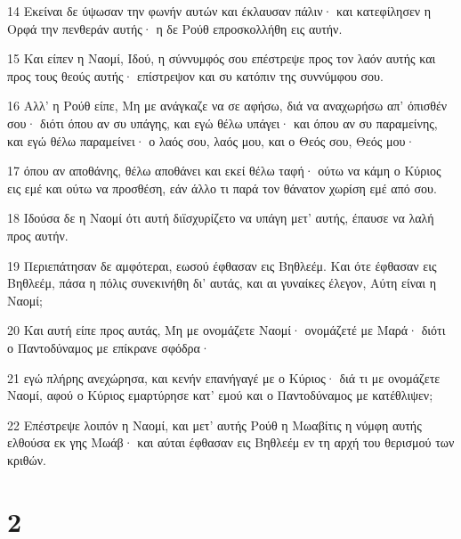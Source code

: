 \par 14 Εκείναι δε ύψωσαν την φωνήν αυτών και έκλαυσαν πάλιν· και κατεφίλησεν η Ορφά την πενθεράν αυτής· η δε Ρούθ επροσκολλήθη εις αυτήν.
\par 15 Και είπεν η Ναομί, Ιδού, η σύννυμφός σου επέστρεψε προς τον λαόν αυτής και προς τους θεούς αυτής· επίστρεψον και συ κατόπιν της συννύμφου σου.
\par 16 Αλλ' η Ρούθ είπε, Μη με ανάγκαζε να σε αφήσω, διά να αναχωρήσω απ' όπισθέν σου· διότι όπου αν συ υπάγης, και εγώ θέλω υπάγει· και όπου αν συ παραμείνης, και εγώ θέλω παραμείνει· ο λαός σου, λαός μου, και ο Θεός σου, Θεός μου·
\par 17 όπου αν αποθάνης, θέλω αποθάνει και εκεί θέλω ταφή· ούτω να κάμη ο Κύριος εις εμέ και ούτω να προσθέση, εάν άλλο τι παρά τον θάνατον χωρίση εμέ από σου.
\par 18 Ιδούσα δε η Ναομί ότι αυτή διϊσχυρίζετο να υπάγη μετ' αυτής, έπαυσε να λαλή προς αυτήν.
\par 19 Περιεπάτησαν δε αμφότεραι, εωσού έφθασαν εις Βηθλεέμ. Και ότε έφθασαν εις Βηθλεέμ, πάσα η πόλις συνεκινήθη δι' αυτάς, και αι γυναίκες έλεγον, Αύτη είναι η Ναομί;
\par 20 Και αυτή είπε προς αυτάς, Μη με ονομάζετε Ναομί· ονομάζετέ με Μαρά· διότι ο Παντοδύναμος με επίκρανε σφόδρα·
\par 21 εγώ πλήρης ανεχώρησα, και κενήν επανήγαγέ με ο Κύριος· διά τι με ονομάζετε Ναομί, αφού ο Κύριος εμαρτύρησε κατ' εμού και ο Παντοδύναμος με κατέθλιψεν;
\par 22 Επέστρεψε λοιπόν η Ναομί, και μετ' αυτής Ρούθ η Μωαβίτις η νύμφη αυτής ελθούσα εκ γης Μωάβ· και αύται έφθασαν εις Βηθλεέμ εν τη αρχή του θερισμού των κριθών.

\chapter{2}

